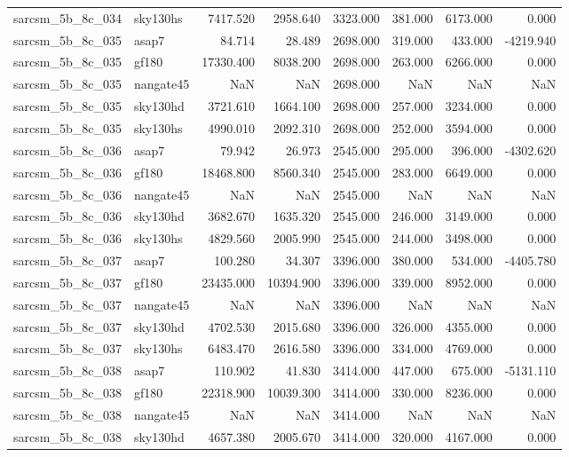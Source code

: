 \begin{tabular}{llrrrrrr}
sarcsm\_5b\_8c\_034 & sky130hs & 7417.520 & 2958.640 & 3323.000 & 381.000 & 6173.000 & 0.000 \\
sarcsm\_5b\_8c\_035 & asap7 & 84.714 & 28.489 & 2698.000 & 319.000 & 433.000 & -4219.940 \\
sarcsm\_5b\_8c\_035 & gf180 & 17330.400 & 8038.200 & 2698.000 & 263.000 & 6266.000 & 0.000 \\
sarcsm\_5b\_8c\_035 & nangate45 & NaN & NaN & 2698.000 & NaN & NaN & NaN \\
sarcsm\_5b\_8c\_035 & sky130hd & 3721.610 & 1664.100 & 2698.000 & 257.000 & 3234.000 & 0.000 \\
sarcsm\_5b\_8c\_035 & sky130hs & 4990.010 & 2092.310 & 2698.000 & 252.000 & 3594.000 & 0.000 \\
sarcsm\_5b\_8c\_036 & asap7 & 79.942 & 26.973 & 2545.000 & 295.000 & 396.000 & -4302.620 \\
sarcsm\_5b\_8c\_036 & gf180 & 18468.800 & 8560.340 & 2545.000 & 283.000 & 6649.000 & 0.000 \\
sarcsm\_5b\_8c\_036 & nangate45 & NaN & NaN & 2545.000 & NaN & NaN & NaN \\
sarcsm\_5b\_8c\_036 & sky130hd & 3682.670 & 1635.320 & 2545.000 & 246.000 & 3149.000 & 0.000 \\
sarcsm\_5b\_8c\_036 & sky130hs & 4829.560 & 2005.990 & 2545.000 & 244.000 & 3498.000 & 0.000 \\
sarcsm\_5b\_8c\_037 & asap7 & 100.280 & 34.307 & 3396.000 & 380.000 & 534.000 & -4405.780 \\
sarcsm\_5b\_8c\_037 & gf180 & 23435.000 & 10394.900 & 3396.000 & 339.000 & 8952.000 & 0.000 \\
sarcsm\_5b\_8c\_037 & nangate45 & NaN & NaN & 3396.000 & NaN & NaN & NaN \\
sarcsm\_5b\_8c\_037 & sky130hd & 4702.530 & 2015.680 & 3396.000 & 326.000 & 4355.000 & 0.000 \\
sarcsm\_5b\_8c\_037 & sky130hs & 6483.470 & 2616.580 & 3396.000 & 334.000 & 4769.000 & 0.000 \\
sarcsm\_5b\_8c\_038 & asap7 & 110.902 & 41.830 & 3414.000 & 447.000 & 675.000 & -5131.110 \\
sarcsm\_5b\_8c\_038 & gf180 & 22318.900 & 10039.300 & 3414.000 & 330.000 & 8236.000 & 0.000 \\
sarcsm\_5b\_8c\_038 & nangate45 & NaN & NaN & 3414.000 & NaN & NaN & NaN \\
sarcsm\_5b\_8c\_038 & sky130hd & 4657.380 & 2005.670 & 3414.000 & 320.000 & 4167.000 & 0.000 \\

\end{tabular}
